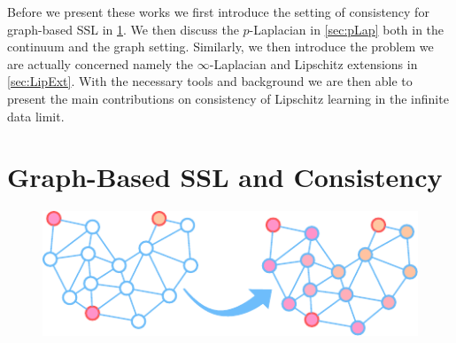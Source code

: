 Before we present these works we first introduce the setting of consistency for graph-based SSL in \cref{sec:GSSL}. We then discuss the $p$-Laplacian in \cref{sec:pLap} both in the continuum and the graph setting. Similarly, we then introduce the problem we are actually concerned namely the $\infty$-Laplacian and Lipschitz extensions in \cref{sec:LipExt}. With the necessary tools and background we are then able to present the main contributions on consistency of Lipschitz learning in the infinite data limit.
%
%
%
\begin{center}%
\end{center}
%
%
%
%
%
%
%
\section{Graph-Based SSL and Consistency}\label{sec:GSSL}

\begin{figure}
\centering
\includegraphics[width=.5\textwidth]{atelier/paradigms/GSSL.pdf}
\end{figure}

